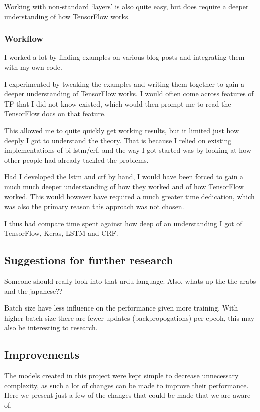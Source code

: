 Working with non-standard `layers' is also quite easy, but does require a
deeper understanding of how TensorFlow works.

\subsubsection*{Workflow}

I worked a lot by finding examples on various blog posts and integrating them
with my own code.

I experimented by tweaking the examples and writing them together to
gain a deeper understanding of TensorFlow works. I would often come across
features of TF that I did not know existed, which would then prompt me to read
the TensorFlow docs on that feature.

This allowed me to quite quickly get working results, but it limited just how
deeply I got to understand the theory. That is because I relied on existing
implementations of bi-lstm/crf, and the way I got started was by looking at how
other people had already tackled the problems.

Had I developed the lstm and crf by hand, I would have been forced to gain a
much much deeper understanding of how they worked and of how TensorFlow worked.
This would however have required a much greater time dedication, which was also
the primary reason this approach was not chosen.

I thus had compare time spent against how deep of an understanding I got of
TensorFlow, Keras, LSTM and CRF\@.

\subsection{Suggestions for further research}

Someone should really look into that urdu language. Also, whats up the the arabs
and the japanese??

Batch size have less influence on the performance given more training.
With higher batch size there are fewer updates (backpropogations) per epcoh,
this may also be interesting to research.


\subsection{Improvements}

The models created in this project were kept simple to decrease unnecessary
complexity, as such a lot of changes can be made to improve their performance.
Here we present just a few of the changes that could be made that we are aware
of.

